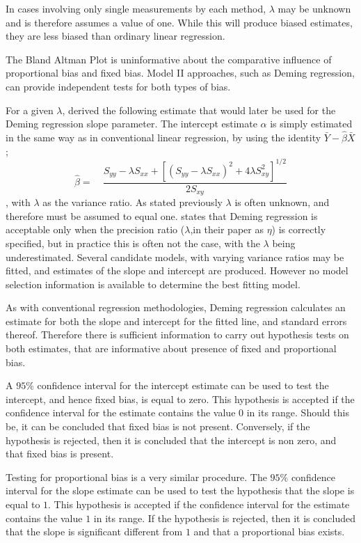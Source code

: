 \documentclass[MAIN.tex]{subfiles}
\begin{document}
In cases involving only single measurements by each method, $\lambda$ may be unknown and is therefore assumes a value of one. While this will produce biased estimates, they are less biased than ordinary linear regression.
	
The Bland Altman Plot is uninformative about the comparative influence of proportional bias and fixed bias. Model II approaches, such as Deming regression,  can provide independent tests for both types of bias.
	
For a given $\lambda$, \citet{Kummel} derived the following estimate that would later be used for the Deming regression slope parameter. The intercept estimate $\alpha$ is simply estimated in the same way as in conventional linear
	regression, by using the identity $\bar{Y}-\hat{\beta}\bar{X}$;
	\begin{equation}
	\hat{\beta} =\quad \frac{S_{yy} - \lambda S_{xx}+[(S_{yy} -
		\lambda S_{xx})^{2}+ 4\lambda S^{2}_{xy}]^{1/2}}{2S_{xy}}
	\end{equation},
	with $\lambda$ as the variance ratio. As stated previously $\lambda$ is often unknown, and therefore must be assumed to equal one. \citet{CarollRupert} states that Deming
	regression is acceptable only when the precision ratio ($\lambda$,in their paper as $\eta$) is correctly specified, but in practice this is often not the case, with the $\lambda$ being underestimated. Several candidate models, with varying variance ratios may be fitted, and estimates of the slope and intercept are produced. However no model selection information is available to determine the best fitting model.
	
	As with conventional regression methodologies, Deming regression calculates an estimate for both the slope and intercept for the
	fitted line, and standard errors thereof. Therefore there is sufficient information to carry out hypothesis tests on both
	estimates, that are informative about presence of fixed and proportional bias.
	
	A $95\%$ confidence interval for the intercept estimate can be used to test the intercept, and hence fixed bias, is equal to
	zero. This hypothesis is accepted if the confidence interval for the estimate contains the value $0$ in its range. Should this be,
	it can be concluded that fixed bias is not present. Conversely, if the hypothesis is rejected, then it is concluded that the
	intercept is non zero, and that fixed bias is present.
	
	Testing for proportional bias is a very similar procedure. The
	$95\%$ confidence interval for the slope estimate can be used to
	test the hypothesis that the slope is equal to $1$. This
	hypothesis is accepted if the confidence interval for the estimate
	contains the value $1$ in its range. If the hypothesis is
	rejected, then it is concluded that the slope is significant
	different from $1$ and that a proportional bias exists.
	
\end{document}

